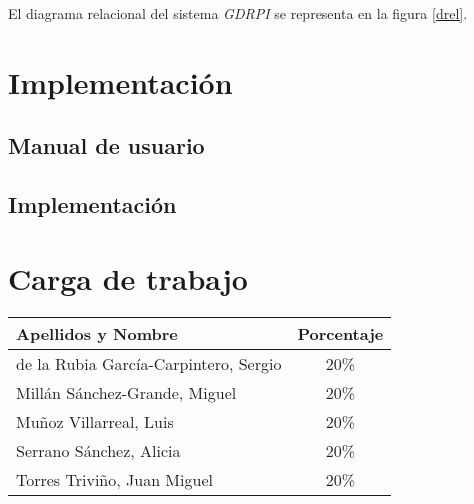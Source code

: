 \documentclass[11pt,a4paper,spanish,twoside]{book}
\begin{document}
El diagrama relacional del sistema \emph{GDRPI} se representa en la figura
\ref{drel}. 

\chapter{Implementación}

\section{Manual de usuario}

\section{Implementación}

\appendix
\chapter{Carga de trabajo}
\begin{center}
  \begin{tabular}{p{10cm}|c}
    \textbf{Apellidos y Nombre} & \textbf{Porcentaje} \\ \hline \hline
    de la Rubia García-Carpintero, Sergio & 20\% \\
    Millán Sánchez-Grande, Miguel         & 20\% \\ 
    Muñoz Villarreal, Luis                & 20\% \\ 
    Serrano Sánchez, Alicia               & 20\% \\ 
    Torres Triviño, Juan Miguel           & 20\% \\
  \end{tabular}
\end{center}

 

\end{document}
